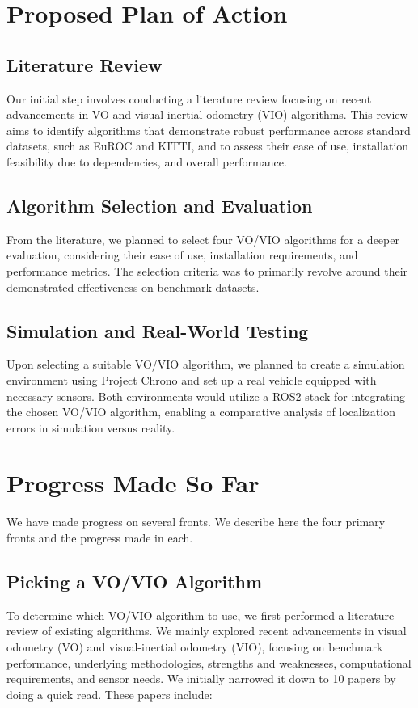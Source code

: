 \documentclass{article}
\begin{document}
\section{Proposed Plan of Action}

\subsection{Literature Review}
Our initial step involves conducting a literature review focusing on recent advancements in VO and visual-inertial odometry (VIO) algorithms. This review aims to identify algorithms that demonstrate robust performance across standard datasets, such as EuROC and KITTI, and to assess their ease of use, installation feasibility due to dependencies, and overall performance.

\subsection{Algorithm Selection and Evaluation}
From the literature, we planned to select four VO/VIO algorithms for a deeper evaluation, considering their ease of use, installation requirements, and performance metrics. The selection criteria was to primarily revolve around their demonstrated effectiveness on benchmark datasets.

\subsection{Simulation and Real-World Testing}
Upon selecting a suitable VO/VIO algorithm, we planned to create a simulation environment using Project Chrono and set up a real vehicle equipped with necessary sensors. Both environments would utilize a ROS2 stack for integrating the chosen VO/VIO algorithm, enabling a comparative analysis of localization errors in simulation versus reality.

\section{Progress Made So Far}
We have made progress on several fronts. We describe here the four primary fronts and the progress made in each.
\subsection{Picking a VO/VIO Algorithm}
To determine which VO/VIO algorithm to use, we first performed a literature review of existing algorithms. We mainly explored recent advancements in visual odometry (VO) and visual-inertial odometry (VIO), focusing on benchmark performance, underlying methodologies, strengths and weaknesses, computational requirements, and sensor needs. We initially narrowed it down to 10 papers by doing a quick read. These papers include:
\end{document}
